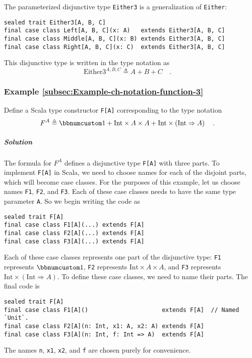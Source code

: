 The parameterized disjunctive type \lstinline!Either3! is a generalization
of \lstinline!Either!:
\begin{lstlisting}
sealed trait Either3[A, B, C]
final case class Left[A, B, C](x: A)   extends Either3[A, B, C]
final case class Middle[A, B, C](x: B) extends Either3[A, B, C]
final case class Right[A, B, C](x: C)  extends Either3[A, B, C]
\end{lstlisting}
This disjunctive type is written in the type notation as
\[
\text{Either3}^{A,B,C}\triangleq A+B+C\quad.
\]


\subsubsection{Example \label{subsec:Example-ch-notation-function-3}\ref{subsec:Example-ch-notation-function-3}}

Define a Scala type constructor \lstinline!F[A]! corresponding to
the type notation 
\[
F^{A}\triangleq\bbnum 1+\text{Int}\times A\times A+\text{Int}\times\left(\text{Int}\Rightarrow A\right)\quad.
\]


\subparagraph{Solution}

The formula for $F^{A}$ defines a disjunctive type \lstinline!F[A]!
with three parts. To implement \lstinline!F[A]! in Scala, we need
to choose names for each of the disjoint parts, which will become
case classes. For the purposes of this example, let us choose names
\lstinline!F1!, \lstinline!F2!, and \lstinline!F3!. Each of these
case classes needs to have the same type parameter \lstinline!A!.
So we begin writing the code as
\begin{lstlisting}
sealed trait F[A]
final case class F1[A](...) extends F[A]
final case class F2[A](...) extends F[A]
final case class F3[A](...) extends F[A]
\end{lstlisting}
Each of these case classes represents one part of the disjunctive
type: \lstinline!F1! represents $\bbnum 1$, \lstinline!F2! represents
$\text{Int}\times A\times A$, and \lstinline!F3! represents $\text{Int}\times\left(\text{Int}\Rightarrow A\right)$.
To define these case classes, we need to name their parts. The final
code is
\begin{lstlisting}
sealed trait F[A]
final case class F1[A]()                     extends F[A]  // Named `Unit`.
final case class F2[A](n: Int, x1: A, x2: A) extends F[A]
final case class F3[A](n: Int, f: Int => A)  extends F[A]
\end{lstlisting}
The names \lstinline!n!, \lstinline!x1!, \lstinline!x2!, and \lstinline!f!
are chosen purely for convenience.

